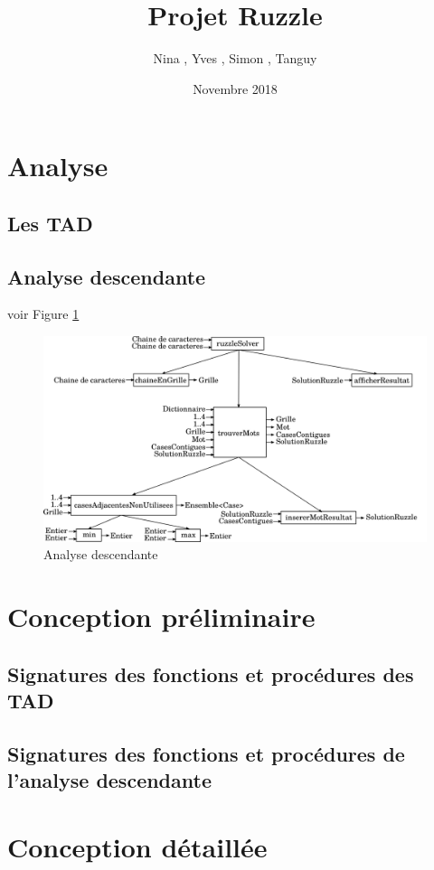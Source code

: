 \documentclass[a4paper]{article}
\title{Projet Ruzzle}
\author{Nina \noun{Lardiere}, Yves \noun{Le Guennec}, Simon \noun{Lebeaud}, Tanguy \noun{Leclerc}}
\date{Novembre 2018}
\begin{document}
	\maketitle
	\section{Analyse}
		\subsection{Les TAD}
			

		\subsection{Analyse descendante}
			voir Figure \ref{fig:AD}
			\begin{figure}
				\centering \includegraphics[width=1\textwidth]{./analyseDescendante/analyseDescendante}
				\caption{\label{fig:AD}Analyse descendante}
			\end{figure}

 \section{Conception préliminaire}
		\subsection{Signatures des fonctions et procédures des TAD}
			
			
			
			

		\subsection{Signatures des fonctions et procédures de l'analyse descendante}
			

\section{Conception détaillée}
	
	
	
\end{document}
